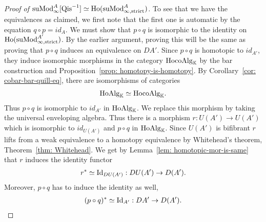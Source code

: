 \documentclass[../thesis.tex]{subfiles}
\begin{document}
\begin{proof}[Proof of $\tt{suMod}_\infty^A{[\tt{Qis}^{-1}]} \simeq \tt{Ho}(\tt{suMod}_{\infty, \tt{strict}}^A)$]
                 To see that we have the equivalences as claimed, we first note that the first one is automatic by the equation $q\circ p = id_A$. We must show that $p\circ q$ is isomorphic to the identity on $\tt{Ho}(\tt{suMod}_{\infty,\tt{strict}}^{A'})$. By the earlier argument, proving this will be the same as proving that $p\circ q$ induces an equivalence on $DA'$. Since $p\circ q$ is homotopic to $id_{A'}$, they induce isomorphic morphisms in the category $\tt{HocoAlg}_\mathbb{K}$ by the bar construction and Proposition~\ref{prop: homotopy-is-homotopy}. By Corollary~\ref{cor: cobar-bar-quill-eq}, there are isomorphisms of categories
                 \begin{align*}
                    \tt{HoAlg}_\mathbb{K} \simeq \tt{HocoAlg}_\mathbb{K}\tt{.}
                 \end{align*}
                 Thus $p\circ q$ is isomorphic to $id_{A'}$ in $\tt{HoAlg}_\mathbb{K}$. We replace this morphism by taking the universal enveloping algebra. Thus there is a morphism $r: U(A') \rightarrow U(A')$ which is isomorphic to $id_{U(A')}$ and $p\circ q$ in $\tt{HoAlg}_\mathbb{K}$. Since $U(A')$ is bifibrant $r$ lifts from a weak equivalence to a homotopy equivalence by Whitehead's theorem, Theorem~\ref{thm: Whitehead}. We get by Lemma~\ref{lem: homotopic-mor-is-same} that $r$ induces the identity functor
                 \begin{align*}
                    r^* \simeq \tt{Id}_{DU(A')} : DU(A') \rightarrow D(A')\tt{.}
                \end{align*}
                Moreover, $p\circ q$ has to induce the identity as well,
                \begin{align*}
                    (p\circ q)^* \simeq \tt{Id}_{A'} : DA' \rightarrow D(A')\tt{.}
                \end{align*}
            \end{proof}
\end{document}
